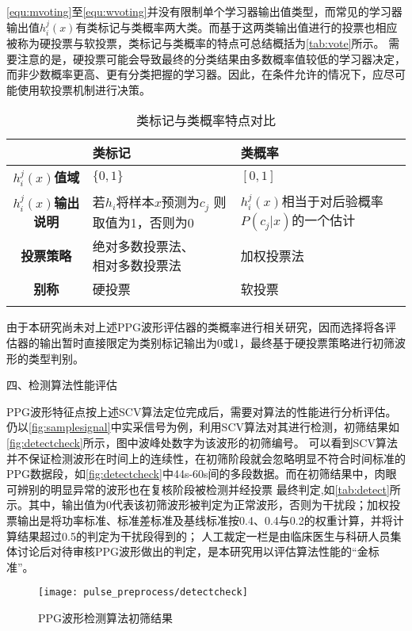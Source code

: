 \autoref{equ:mvoting}至\autoref{equ:wvoting}并没有限制单个学习器输出值类型，而常见的学习器输出值$h_i^j(x)$有类标记与类概率两大类。而基于这两类输出值进行的投票也相应被称为硬投票与软投票，类标记与类概率的特点可总结概括为\autoref{tab:vote}所示。
需要注意的是，硬投票可能会导致最终的分类结果由多数概率值较低的学习器决定，而非少数概率更高、更有分类把握的学习器。因此，在条件允许的情况下，应尽可能使用软投票机制进行决策。
\begin{table}[htbp]
    \centering
    \caption{\label{tab:vote}类标记与类概率特点对比}
    \begin{tabularx}{\linewidth}{c|X<{\centering}X<{\centering}}
        \Xhline{1pt} 
            &\textbf{类标记}&\textbf{类概率}\\
        \hline
        \textbf{$h_i^j(x)$值域}  &$\{0,1\}$    &$[0,1]$     \\
        \textbf{$h_i^j(x)$输出说明}&\tabincell{c}{若$h_i$将样本$x$预测为$c_j$\\则取值为1，否则为0}&\tabincell{c}{$h_i^j(x)$相当于对后验概率\\$P(c_j|x)$的一个估计}\\
        \textbf{投票策略}&\tabincell{c}{绝对多数投票法、\\相对多数投票法}&加权投票法\\
        \textbf{别称}    &硬投票 &软投票 \\
        \Xhline{1pt}
    \end{tabularx}
\end{table}

由于本研究尚未对上述PPG波形评估器的类概率进行相关研究，因而选择将各评估器的输出暂时直接限定为类别标记输出为0或1，最终基于硬投票策略进行初筛波形的类型判别。

四、检测算法性能评估

PPG波形特征点按上述SCV算法定位完成后，需要对算法的性能进行分析评估。仍以\autoref{fig:samplesignal}中实采信号为例，利用SCV算法对其进行检测，初筛结果如\autoref{fig:detectcheck}所示，图中波峰处数字为该波形的初筛编号。
可以看到SCV算法并不保证检测波形在时间上的连续性，在初筛阶段就会忽略明显不符合时间标准的PPG数据段，如\autoref{fig:detectcheck}中44s-60s间的多段数据。而在初筛结果中，肉眼可辨别的明显异常的波形也在复核阶段被检测并经投票
最终判定,如\autoref{tab:detect}所示。其中，输出值为0代表该初筛波形被判定为正常波形，否则为干扰段；加权投票输出是将功率标准、标准差标准及基线标准按0.4、0.4与0.2的权重计算，并将计算结果超过0.5的判定为干扰段得到的；
人工裁定一栏是由临床医生与科研人员集体讨论后对待审核PPG波形做出的判定，是本研究用以评估算法性能的“金标准”。
\begin{figure}[htbp]
    \centering
    \texttt{[image: pulse\_preprocess/detectcheck]}
    \caption{\label{fig:detectcheck}PPG波形检测算法初筛结果}
\end{figure}


